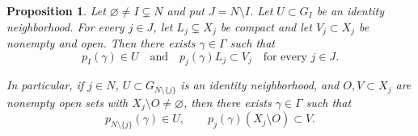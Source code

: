 \documentclass[11pt]{amsart}
\numberwithin{equation}{section}
\newtheorem{proposition}[theorem]{Proposition}
\theoremstyle{definition}
\begin{document}
	\begin{proposition}
		\label{lem:abstract-recurrence-contraction}
		\label{prop:codim-one-strip}
		Let $\varnothing\neq I\subsetneq N$ and put $J=N\setminus I$.  Let
		$U\subset G_I$ be an identity neighborhood.  For every $j\in J$, let
		$L_j\subsetneq X_j$ be compact and let $V_j\subset X_j$ be nonempty and open.
		Then there exists $\gamma\in\Gamma$ such that
		\begin{equation}
			\label{eq:simultaneous-recurrence-contraction}
			p_I(\gamma)\in U
			\quad\text{and}\quad
			p_j(\gamma)L_j\subset V_j
			\quad\text{for every }j\in J.
		\end{equation}
		
		In particular, if $j\in N$, $U\subset G_{N\setminus\{j\}}$ is an identity
		neighborhood, and $O,V\subset X_j$ are nonempty open sets with
		$X_j\setminus O\neq\varnothing$, then there exists $\gamma\in\Gamma$ such that
		\begin{equation}
			\label{eq:codim-one-strip}
			p_{N\setminus\{j\}}(\gamma)\in U,
			\qquad
			p_j(\gamma)(X_j\setminus O)\subset V.
		\end{equation}
	\end{proposition}
	
\end{document}
